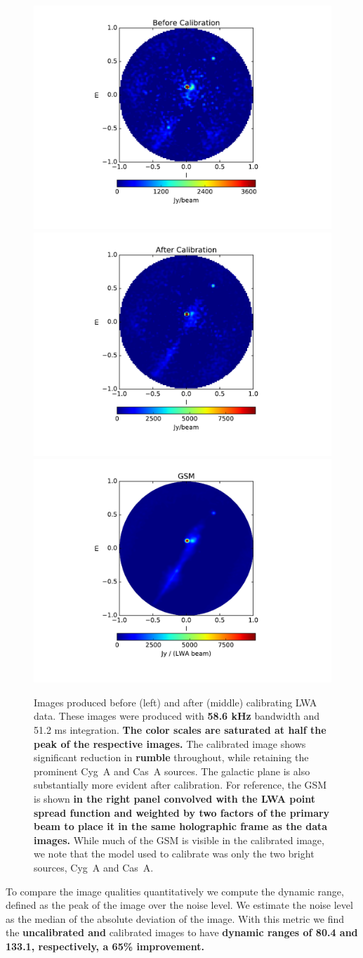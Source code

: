 \documentclass[a4paper,fleqn,usenatbib]{../mnras}
\begin{document}
\begin{figure}
\begin{center}
\includegraphics[width=0.3\linewidth]{fig9a.pdf}
\includegraphics[width=0.3\linewidth]{fig9b.pdf}
\includegraphics[width=0.3\linewidth]{fig9c.pdf}
\caption{Images produced before (left) and after (middle) calibrating LWA data. These images 
were produced with \textbf{58.6 kHz} bandwidth and 51.2 ms integration. 
\textbf{The color scales are saturated at half the peak of the respective images.}
The calibrated image shows 
significant reduction in \textbf{rumble} throughout, while retaining the prominent Cyg~A and 
Cas~A sources. The galactic plane is also substantially more evident after calibration. For 
reference, the GSM is shown \textbf{in the 
right panel convolved with the LWA point spread function and weighted by two factors
of the primary beam to place it in the same holographic frame as the data images.} While much of the GSM is visible in the calibrated image, we 
note that the model used to calibrate was only the two bright sources, Cyg~A and Cas~A.
}
\label{fig:data_images}
\end{center}
\end{figure}

To compare the image qualities quantitatively we compute the dynamic range, defined as the 
peak of the image over the noise level. We estimate the noise level as the median of the 
absolute deviation of the image. With this metric we find the \textbf{uncalibrated 
and} calibrated images to have \textbf{dynamic ranges of 80.4 and 133.1, respectively, a 65\% 
improvement.}
\end{document}
